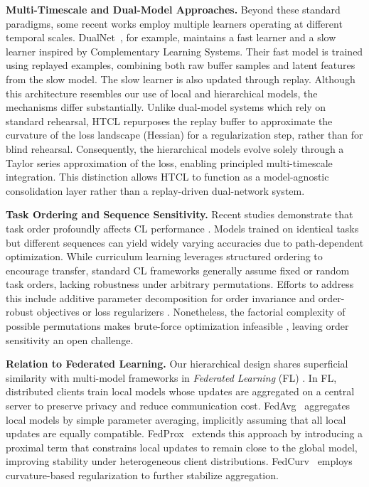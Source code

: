 \textbf{Multi-Timescale and Dual-Model Approaches.}
Beyond these standard paradigms, some recent works employ multiple learners operating at different temporal scales. DualNet~\cite{pham2021dualnet}, for example, maintains a fast learner and a slow learner inspired by Complementary Learning Systems. Their fast model is trained using replayed examples, combining both raw buffer samples and latent features from the slow model. The slow learner is also updated through replay. Although this architecture resembles our use of local and hierarchical models, the mechanisms differ substantially. Unlike dual-model systems which rely on standard rehearsal, HTCL repurposes the replay buffer to approximate the curvature of the loss landscape (Hessian) for a regularization step, rather than for blind rehearsal. Consequently, the hierarchical models evolve solely through a Taylor series approximation of the loss, enabling principled multi-timescale integration. This distinction allows HTCL to function as a model-agnostic consolidation layer rather than a replay-driven dual-network system.

\textbf{Task Ordering and Sequence Sensitivity.}
Recent studies demonstrate that task order profoundly affects CL performance \cite{bell2022effect,riemer2018learning,yoon2019scalable}. Models trained on identical tasks but different sequences can yield widely varying accuracies due to path-dependent optimization. While curriculum learning leverages structured ordering to encourage transfer, standard CL frameworks generally assume fixed or random task orders, lacking robustness under arbitrary permutations. Efforts to address this include additive parameter decomposition for order invariance \cite{yoon2019scalable} and order-robust objectives or loss regularizers \cite{dohare2024loss,guo2024continual}. Nonetheless, the factorial complexity of possible permutations makes brute-force optimization infeasible \cite{knoblauch2020optimal}, leaving order sensitivity an open challenge.

\textbf{Relation to Federated Learning.}
Our hierarchical design shares superficial similarity with multi-model frameworks in \emph{Federated Learning} (FL) \cite{mcmahan2017communication,li2020federated}. In FL, distributed clients train local models whose updates are aggregated on a central server to preserve privacy and reduce communication cost. FedAvg~\cite{mcmahan2017communication} aggregates local models by simple parameter averaging, implicitly assuming that all local updates are equally compatible. FedProx~\cite{li2020federated} extends this approach by introducing a proximal term that constrains local updates to remain close to the global model, improving stability under heterogeneous client distributions. FedCurv~\cite{shoham2019overcoming} employs curvature-based regularization to further stabilize aggregation.

